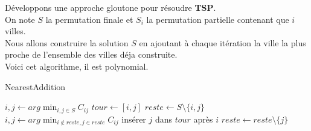 \documentclass[12pt]{article}
\newcommand{\titre}[1]{\textcolor{title}{#1}}
\begin{document}
Développons une approche gloutone pour résoudre \textbf{\titre{TSP}}.\\
On note $S$ la permutation finale et $S_i$ la permutation partielle contenant que $i$ villes.\\
Nous allons construire la solution $S$ en ajoutant à chaque itération la ville la plus proche de l'ensemble des villes déja construite.\\
Voici cet algorithme, il est polynomial.

\begin{algorithm}[h!]
\caption{NearestAddition}
\begin{algorithmic}[1]
\STATE $i,j \leftarrow arg\min_{i,j\in S} C_{ij}$
\STATE $tour \leftarrow [i,j]$
\STATE $reste \leftarrow S \setminus \{i,j\}$
\STATE $i,j \leftarrow arg\min_{i\not\in reste,j\in reste} C_{ij}$
\STATE insérer $j$ dans $tour$ après $i$
\STATE $reste\leftarrow reste\setminus\{j\}$
\ENDWHILE
\end{algorithmic}
\end{algorithm}
\end{document}
